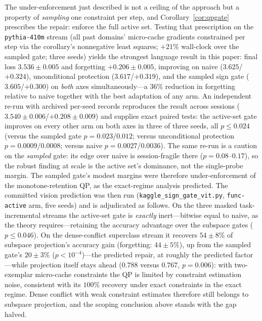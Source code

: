 \documentclass[10pt,a4paper]{article}
\theoremstyle{plain}
\theoremstyle{definition}
\begin{document}
The under-enforcement just described is not a ceiling of the approach but a property of
\emph{sampling} one constraint per step, and Corollary~\ref{cor:qpgate} prescribes the
repair: enforce the full active set. Testing that prescription on the
\texttt{pythia-410m} stream (all past domains' micro-cache gradients constrained per
step via the corollary's nonnegative least squares; $+21\%$ wall-clock over the sampled
gate; three seeds) yields the strongest language result in this paper: final loss
$3.536\pm0.005$ and forgetting $+0.206\pm0.005$, improving on naive
($3.625$/$+0.324$), unconditional protection ($3.617$/$+0.319$), and the sampled sign
gate ($3.605$/$+0.300$) on \emph{both} axes simultaneously---a $36\%$ reduction in
forgetting relative to naive together with the best adaptation of any arm. An
independent re-run with archived per-seed records reproduces the result across sessions
($3.540\pm0.006$/$+0.208\pm0.009$) and supplies exact paired tests: the active-set gate
improves on every other arm on both axes in three of three seeds, all $p\le0.024$
(versus the sampled gate $p=0.023$/$0.012$; versus unconditional protection
$p=0.0009$/$0.0008$; versus naive $p=0.0027$/$0.0036$). The same re-run is a caution on
the \emph{sampled} gate: its edge over naive is session-fragile there
($p=0.08$--$0.17$), so the robust finding at scale is the active set's dominance, not
the single-probe margin. The sampled gate's modest margins were therefore
under-enforcement of the monotone-retention QP, as the exact-regime analysis predicted.
The committed vision prediction was then run (\texttt{kaggle\_sign\_gate\_vit.py},
\texttt{func-active} arm, five seeds) and is adjudicated as follows. On the three
masked task-incremental streams the active-set gate is \emph{exactly} inert---bitwise
equal to naive, as the theory requires---retaining the accuracy advantage over the
subspace gates ($p\le0.046$). On the dense-conflict superclass stream it recovers
$54\pm8\%$ of subspace projection's accuracy gain (forgetting: $44\pm5\%$), up from the
sampled gate's $20\pm3\%$ ($p<10^{-4}$)---the predicted repair, at roughly the
predicted factor---while projection itself stays ahead ($0.788$ versus $0.767$,
$p=0.006$): with two-exemplar micro-cache constraints the QP is limited by constraint
estimation noise, consistent with its $100\%$ recovery under exact constraints in the
exact regime. Dense conflict with weak constraint estimates therefore still belongs to
subspace projection, and the scoping conclusion above stands with the gap halved.
\end{document}
